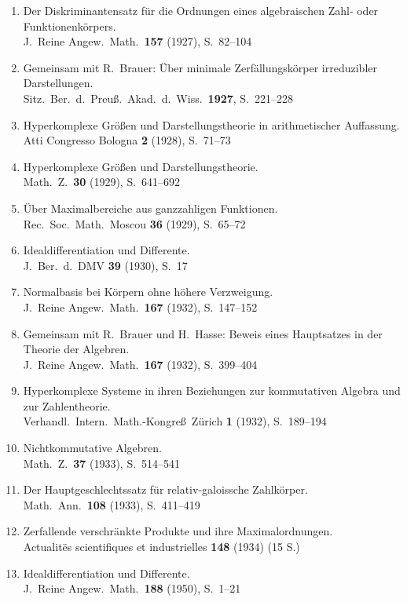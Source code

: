 \documentclass[12pt,a4paper]{article}
\theoremstyle{plain}
\theoremstyle{definition}
\theoremstyle{remark}
\begin{document}
\begin{enumerate}[label={\small\arabic*.},leftmargin=2em,itemsep=0.3em]
\item Der Diskriminantensatz f\"ur die Ordnungen eines algebraischen Zahl-
oder Funktionenk\"orpers.\\
J.\ Reine Angew.\ Math.\ \textbf{157} (1927), S.~82--104

\item Gemeinsam mit R.\ Brauer: \"Uber minimale Zerf\"allungsk\"orper irreduzibler
Darstellungen.\\
Sitz.\ Ber.\ d.\ Preu\ss.\ Akad.\ d.\ Wiss.\ \textbf{1927}, S.~221--228

\item Hyperkomplexe Gr\"o\ss en und Darstellungstheorie in arithmetischer Auffassung.\\
Atti Congresso Bologna \textbf{2} (1928), S.~71--73

\item Hyperkomplexe Gr\"o\ss en und Darstellungstheorie.\\
Math.\ Z.\ \textbf{30} (1929), S.~641--692

\item \"Uber Maximalbereiche aus ganzzahligen Funktionen.\\
Rec.\ Soc.\ Math.\ Moscou \textbf{36} (1929), S.~65--72

\item Idealdifferentiation und Differente.\\
J.\ Ber.\ d.\ DMV \textbf{39} (1930), S.~17

\item Normalbasis bei K\"orpern ohne h\"ohere Verzweigung.\\
J.\ Reine Angew.\ Math.\ \textbf{167} (1932), S.~147--152

\item Gemeinsam mit R.\ Brauer und H.\ Hasse: Beweis eines Hauptsatzes in
der Theorie der Algebren.\\
J.\ Reine Angew.\ Math.\ \textbf{167} (1932), S.~399--404

\item Hyperkomplexe Systeme in ihren Beziehungen zur kommutativen Algebra
und zur Zahlentheorie.\\
Verhandl.\ Intern.\ Math.-Kongre\ss\ Z\"urich \textbf{1} (1932), S.~189--194

\item Nichtkommutative Algebren.\\
Math.\ Z.\ \textbf{37} (1933), S.~514--541

\item Der Hauptgeschlechtssatz f\"ur relativ-galoissche Zahlk\"orper.\\
Math.\ Ann.\ \textbf{108} (1933), S.~411--419

\item Zerfallende verschr\"ankte Produkte und ihre Maximalordnungen.\\
Actualit\"es scientifiques et industrielles \textbf{148} (1934) (15 S.)

\item Idealdifferentiation und Differente.\\
J.\ Reine Angew.\ Math.\ \textbf{188} (1950), S.~1--21
\end{enumerate}
\end{document}
